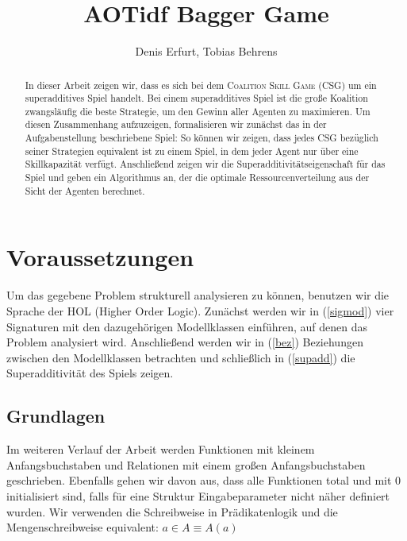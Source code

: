 \documentclass[12pt]{article}
\theoremstyle{break}
\begin{document}
\title{AOTidf Bagger Game}
\author{Denis Erfurt, Tobias Behrens}

\begin{abstract}
  \noindent
  In dieser Arbeit zeigen wir, dass es sich bei dem \textsc{Coalition Skill Game} (CSG) um ein superadditives Spiel handelt. Bei einem superadditives Spiel ist die große Koalition zwangsläufig die beste Strategie, um den Gewinn aller Agenten zu maximieren. Um diesen Zusammenhang aufzuzeigen, formalisieren wir zunächst das in der Aufgabenstellung beschriebene Spiel: So können wir zeigen, dass jedes CSG bezüglich seiner Strategien equivalent ist zu einem Spiel, in dem jeder Agent nur über eine Skillkapazität verfügt. Anschließend zeigen wir die Superadditivitätseigenschaft für das Spiel und geben ein Algorithmus an, der die optimale Ressourcenverteilung aus der Sicht der Agenten berechnet.
\end{abstract}



\maketitle


\section{Voraussetzungen}
Um das gegebene Problem strukturell analysieren zu können, benutzen wir die Sprache der HOL (Higher Order Logic). Zunächst werden wir in (\ref{sigmod}) vier Signaturen mit den dazugehörigen Modellklassen einführen, auf denen das Problem analysiert wird. Anschließend werden wir in (\ref{bez}) Beziehungen zwischen den Modellklassen betrachten und schließlich in (\ref{supadd}) die Superadditivität des Spiels zeigen.
\\


\subsection{Grundlagen}
  Im weiteren Verlauf der Arbeit werden Funktionen mit kleinem Anfangsbuchstaben und Relationen mit einem großen Anfangsbuchstaben geschrieben. Ebenfalls gehen wir davon aus, dass alle Funktionen total und mit 0 initialisiert sind, falls für eine Struktur Eingabeparameter nicht näher definiert wurden. Wir verwenden die Schreibweise in Prädikatenlogik und die Mengenschreibweise equivalent: $a\in A \equiv A(a)$
\end{document}
